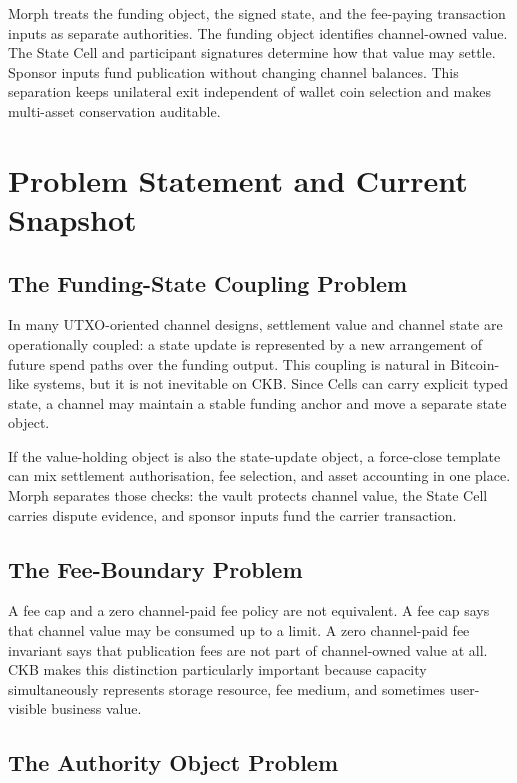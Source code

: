 \documentclass[a4paper,11pt]{article}
\begin{document}
Morph treats the funding object, the signed state, and the fee-paying
transaction inputs as separate authorities. The funding object identifies
channel-owned value. The State Cell and participant signatures determine how
that value may settle. Sponsor inputs fund publication without changing channel
balances. This separation keeps unilateral exit independent of wallet coin
selection and makes multi-asset conservation auditable.

\clearpage
\section{Problem Statement and Current Snapshot}

\subsection{The Funding-State Coupling Problem}

In many UTXO-oriented channel designs, settlement value and channel state are operationally coupled: a state update is represented by a new arrangement of future spend paths over the funding output. This coupling is natural in Bitcoin-like systems, but it is not inevitable on CKB. Since Cells can carry explicit typed state, a channel may maintain a stable funding anchor and move a separate state object.

If the value-holding object is also the state-update object, a force-close template can mix settlement authorisation, fee selection, and asset accounting in one place. Morph separates those checks: the vault protects channel value, the State Cell carries dispute evidence, and sponsor inputs fund the carrier transaction.

\subsection{The Fee-Boundary Problem}

A fee cap and a zero channel-paid fee policy are not equivalent. A fee cap says that channel value may be consumed up to a limit. A zero channel-paid fee invariant says that publication fees are not part of channel-owned value at all. CKB makes this distinction particularly important because capacity simultaneously represents storage resource, fee medium, and sometimes user-visible business value.

\subsection{The Authority Object Problem}
\end{document}
